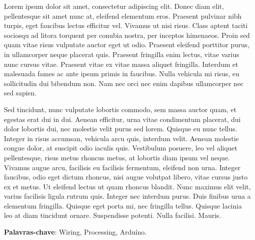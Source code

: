 \documentclass[
	article,			%
	11pt,				%
	oneside,			%
	a4paper,			%
	english,			%
	brazil,				%
	sumario=tradicional
	]{abntex2}
\begin{document}

\frenchspacing 


%
%
\maketitle

\begin{resumoumacoluna}
 

Lorem ipsum dolor sit amet, consectetur adipiscing elit. Donec diam elit, pellentesque sit amet nunc at, eleifend elementum eros. Praesent pulvinar nibh turpis, eget faucibus lectus efficitur vel. Vivamus ut nisi risus. Class aptent taciti sociosqu ad litora torquent per conubia nostra, per inceptos himenaeos. Proin sed quam vitae risus vulputate auctor eget ut odio. Praesent eleifend porttitor purus, in ullamcorper neque placerat quis. Praesent fringilla enim lectus, vitae varius nunc cursus vitae. Praesent vitae ex vitae massa aliquet fringilla. Interdum et malesuada fames ac ante ipsum primis in faucibus. Nulla vehicula mi risus, eu sollicitudin dui bibendum non. Nam nec orci nec enim dapibus ullamcorper nec sed sapien.

Sed tincidunt, nunc vulputate lobortis commodo, sem massa auctor quam, et egestas erat dui in dui. Aenean efficitur, urna vitae condimentum placerat, dui dolor lobortis dui, nec molestie velit purus sed lorem. Quisque eu nunc tellus. Integer in risus accumsan, vehicula arcu quis, interdum velit. Aenean molestie congue dolor, at suscipit odio iaculis quis. Vestibulum posuere, leo vel aliquet pellentesque, risus metus rhoncus metus, at lobortis diam ipsum vel neque. Vivamus augue arcu, facilisis eu facilisis fermentum, eleifend non urna. Integer faucibus, odio eget dictum rhoncus, nisi augue volutpat libero, vitae cursus justo ex et metus. Ut eleifend lectus ut quam rhoncus blandit. Nunc maximus elit velit, varius facilisis ligula rutrum quis. Integer nec interdum purus. Duis finibus urna a elementum fringilla. Quisque eget porta mi, nec fringilla tellus. Quisque lacinia leo at diam tincidunt ornare. Suspendisse potenti. Nulla facilisi. Mauris. 
 
 \vspace{\onelineskip}
 
 \noindent
 \textbf{Palavras-chave}: Wiring, Processing, Arduíno.
\end{resumoumacoluna}
\end{document}
